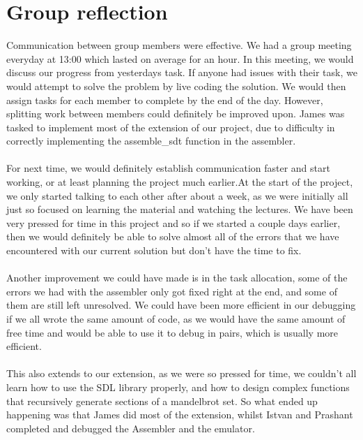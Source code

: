 \documentclass[11pt]{article}
\begin{document}
\section{Group reflection}
Communication between group members were effective. We had a group meeting 
everyday at 13:00 which lasted on average for an hour. In this meeting, we would
discuss our progress from yesterdays task. If anyone had issues with their task,
we would attempt to solve the problem by live coding the solution. We would then
assign tasks for each member to complete by the end of the day. However,
splitting work between members could definitely be improved upon. James was tasked
to implement most of the extension of our project, due to difficulty in correctly
implementing the assemble\_sdt function in the assembler.
\\~\\
For next time, we would definitely establish communication faster and start working,
or at least planning the project much earlier.At the start of the project,
we only started talking to each other after about a week, as we were initially
all just so focused on learning the material and watching the lectures. We have
been very pressed for time in this project and so if we started a couple days earlier,
then we would definitely be able to solve almost all of the errors that we have
encountered with our current solution but don't have the time to fix.
\\~\\
Another improvement we could have made is in the task allocation, some of the errors we had with the assembler
only got fixed right at the end, and some of them are still left unresolved.
We could have been more efficient in our debugging if we all wrote the same amount of code,
as we would have the same amount of free time and would be able to use it to debug
in pairs, which is usually more efficient.
\\~\\
This also extends to our extension, as we were so pressed for time, we couldn't
all learn how to use the SDL library properly, and how to design complex functions
that recursively generate sections of a mandelbrot set. So what ended up happening
was that James did most of the extension, whilst Istvan and Prashant completed and debugged
the Assembler and the emulator.
\end{document}
